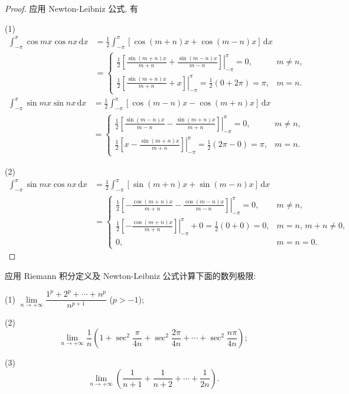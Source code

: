 \begin{proof}
应用 Newton-Leibniz 公式, 有

(1)
\[
\begin{aligned}
\int_{-\pi}^{\pi}\cos mx\cos nx\,\mathrm{d}x&=\frac{1}{2}\int_{-\pi}^{\pi}[\cos(m+n)x+\cos(m-n)x]\,\mathrm{d}x\\
&=\begin{cases}\frac{1}{2}\left.\left[\frac{\sin(m+n)x}{m+n}+\frac{\sin(m-n)x}{m-n}\right]\right|_{-\pi}^{\pi}=0,&m\neq n,\\[2mm]\frac{1}{2}\left.\left[\frac{\sin(m+n)x}{m+n}+x\right]\right|_{-\pi}^{\pi}=\frac{1}{2}(0+2\pi)=\pi,&m=n.\end{cases}
\end{aligned}
\]
\[
\begin{aligned}
\int_{-\pi}^{\pi}\sin mx\sin nx\,\mathrm{d}x&=\frac{1}{2}\int_{-\pi}^{\pi}[\cos(m-n)x-\cos(m+n)x]\,\mathrm{d}x\\
&=\begin{cases}\frac{1}{2}\left.\left[\frac{\sin(m-n)x}{m-n}-\frac{\sin(m+n)x}{m+n}\right]\right|_{-\pi}^{\pi}=0,&m\neq n,\\[2mm]\frac{1}{2}\left.\left[x-\frac{\sin(m+n)x}{m+n}\right]\right|_{-\pi}^{\pi}=\frac{1}{2}(2\pi-0)=\pi,&m=n.\end{cases}
\end{aligned}
\]

(2)
\[
\begin{aligned}
\int_{-\pi}^{\pi}\sin mx\cos nx\,\mathrm{d}x&=\frac{1}{2}\int_{-\pi}^{\pi}[\sin(m+n)x+\sin(m-n)x]\,\mathrm{d}x\\
&=\begin{cases}\frac{1}{2}\left.\left[-\frac{\cos(m+n)x}{m+n}-\frac{\cos(m-n)x}{m-n}\right]\right|_{-\pi}^{\pi}=0,&m\neq n,\\[2mm]\frac{1}{2}\left.\left[-\frac{\cos(m+n)x}{m+n}\right]\right|_{-\pi}^{\pi}+0=\frac{1}{2}(0+0)=0,&m=n,\,m+n\neq 0,\\[2mm]0,&m=n=0.\end{cases}
\end{aligned}
\]
\end{proof}

\begin{example}\label{ex:6.3.4}
应用 Riemann 积分定义及 Newton-Leibniz 公式计算下面的数列极限:

(1) $\lim\limits_{n\to+\infty}\dfrac{1^{p}+2^{p}+\cdots+n^{p}}{n^{p+1}}$ ($p>-1$);

(2)
\[
\lim_{n\to+\infty}\frac{1}{n}\left(1+\sec^{2}\frac{\pi}{4n}+\sec^{2}\frac{2\pi}{4n}+\cdots+\sec^{2}\frac{n\pi}{4n}\right);
\]

(3)
\[
\lim_{n\to+\infty}\left(\frac{1}{n+1}+\frac{1}{n+2}+\cdots+\frac{1}{2n}\right).
\]
\end{example}

